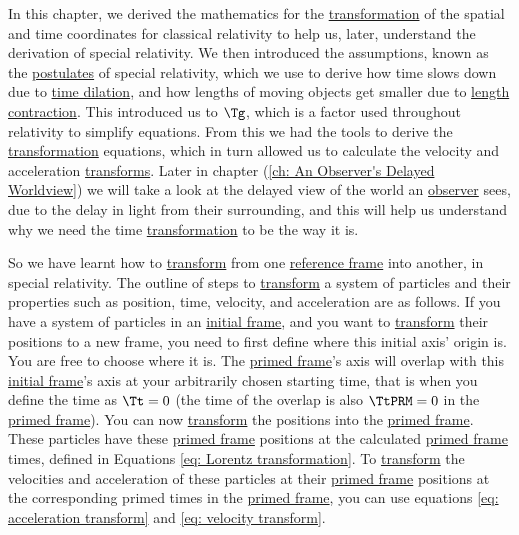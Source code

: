 In this chapter, we derived the mathematics for the \hyperlink{def-transform}{transformation} of the spatial and time coordinates for classical relativity to help us, later, understand the derivation of special relativity.
We then introduced the assumptions, known as the \hyperlink{def-postulates}{postulates} of special relativity, which we use to derive how time slows down due to \hyperlink{def-time-dilation}{time dilation}, and how lengths of moving objects get smaller due to \hyperlink{def-length-contraction}{length contraction}.
This introduced us to $\Tg $, which is a factor used throughout relativity to simplify equations.
From this we had the tools to derive the \hyperlink{def-transform}{transformation} equations, which in turn allowed us to calculate the velocity and acceleration \hyperlink{def-transform}{transforms}.
Later in chapter (\ref{ch: An Observer's Delayed Worldview}) we will take a look at the delayed view of the world an \hyperlink{def-observer}{observer} sees, due to the delay in light from their surrounding, and this will help us understand why we need the time \hyperlink{def-transform}{transformation} to be the way it is.

So we have learnt how to \hyperlink{def-transform}{transform} from one \hyperlink{def-Reference-frame}{reference frame} into another, in special relativity.
The outline of steps to \hyperlink{def-transform}{transform} a system of particles and their properties such as position, time, velocity, and acceleration are as follows.
If you have a system of particles in an \hyperlink{def-initial-Frame}{initial frame}, and you want to \hyperlink{def-transform}{transform} their positions to a new frame, you need to first define where this initial axis' origin is.
You are free to choose where it is.
The \hyperlink{def-Primed-Frame}{primed frame}'s axis will overlap with this \hyperlink{def-initial-Frame}{initial frame}'s axis at your arbitrarily chosen starting time, that is when you define the time as ${\Tt }=0$ (the time of the overlap is also $\TtPRM =0$ in the \hyperlink{def-Primed-Frame}{primed frame}).
You can now \hyperlink{def-transform}{transform} the positions into the \hyperlink{def-Primed-Frame}{primed frame}.
These particles have these \hyperlink{def-Primed-Frame}{primed frame} positions at the calculated \hyperlink{def-Primed-Frame}{primed frame} times, defined in Equations \eqref{eq: Lorentz transformation}.
To \hyperlink{def-transform}{transform} the velocities and acceleration of these particles at their \hyperlink{def-Primed-Frame}{primed frame} positions at the corresponding primed times in the \hyperlink{def-Primed-Frame}{primed frame}, you can use equations \eqref{eq: acceleration transform} and \eqref{eq: velocity transform}.

